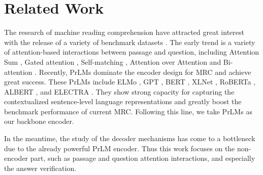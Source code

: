 \documentclass[letterpaper]{article} %
\begin{document}
\section{Related Work}
The research of machine reading comprehension have attracted great interest with the release of a variety of benchmark datasets \cite{hill2015goldilocks,hermann2015teaching,Rajpurkar2016SQuAD,Joshi2017TriviaQA,Rajpurkar2018Know,lai2017race}. %
The early trend is a variety of attention-based interactions between passage and question, %
including Attention Sum \cite{kadlec2016text}, Gated attention \cite{Dhingra2017Gated}, Self-matching  \cite{Wang2017Gated}, Attention over Attention \cite{Cui2017Attention} and Bi-attention  \cite{Seo2016Bidirectional}.
Recently, PrLMs dominate the encoder design for MRC and achieve great success. These PrLMs include ELMo \cite{peters2018deep}, GPT \cite{radford2018improving}, BERT \cite{devlin2018bert}, XLNet \cite{yang2019xlnet},  RoBERTa \cite{liu2019roberta}, ALBERT \cite{Lan2020ALBERT}, and ELECTRA \cite{clark2019electra}. They show strong capacity for capturing the contextualized sentence-level language representations and greatly boost the benchmark performance of current MRC.
Following this line, we take PrLMs as our backbone encoder.

In the meantime, the study of the decoder mechanisms has come to a bottleneck due to the already powerful PrLM encoder. %
Thus this work focuses on the non-encoder part, such as passage and question attention interactions, and especially the answer verification. %
\end{document}
